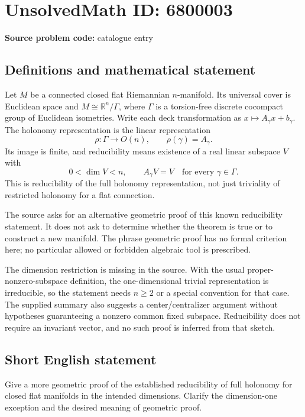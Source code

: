 \documentclass[11pt]{article}
\newcommand{\R}{\mathbb{R}}
\begin{document}
\section*{UnsolvedMath ID: 6800003}
\textbf{Source problem code:} catalogue entry
\subsection{Definitions and mathematical statement}
Let $M$ be a connected closed flat Riemannian $n$-manifold. Its universal cover is Euclidean space and $M\cong\R^n/\Gamma$, where $\Gamma$ is a torsion-free discrete cocompact group of Euclidean isometries. Write each deck transformation as $x\mapsto A_\gamma x+b_\gamma$. The holonomy representation is the linear representation
\[
\rho:\Gamma\longrightarrow O(n),\qquad \rho(\gamma)=A_\gamma.
\]
Its image is finite, and reducibility means existence of a real linear subspace $V$ with
\[
0<\dim V<n,\qquad A_\gamma V=V\quad\text{for every }\gamma\in\Gamma.
\]
This is reducibility of the full holonomy representation, not just triviality of restricted holonomy for a flat connection.

The source asks for an alternative geometric proof of this known reducibility statement. It does not ask to determine whether the theorem is true or to construct a new manifold. The phrase geometric proof has no formal criterion here; no particular allowed or forbidden algebraic tool is prescribed.

The dimension restriction is missing in the source. With the usual proper-nonzero-subspace definition, the one-dimensional trivial representation is irreducible, so the statement needs $n\geq2$ or a special convention for that case. The supplied summary also suggests a center/centralizer argument without hypotheses guaranteeing a nonzero common fixed subspace. Reducibility does not require an invariant vector, and no such proof is inferred from that sketch.
\subsection{Short English statement}
Give a more geometric proof of the established reducibility of full holonomy for closed flat manifolds in the intended dimensions. Clarify the dimension-one exception and the desired meaning of geometric proof.
\end{document}
